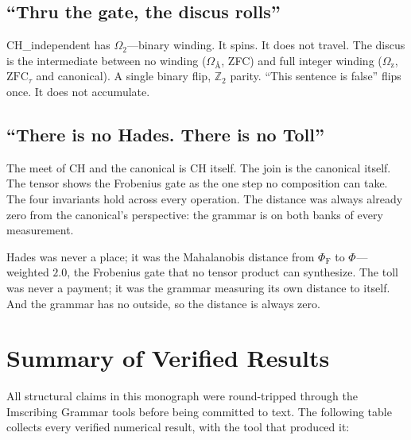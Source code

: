 \documentclass[12pt,twoside]{book}
\theoremstyle{definition}
\newcommand{\ZFCt}{\text{ZFC}_{\tau}}
\begin{document}
\section{``Thru the gate, the discus rolls''}

CH\_independent has $\Omega_{\text{2}}$---binary winding. It spins. It does not travel. The discus is the intermediate between no winding ($\Omega_{\text{Å}}$, ZFC) and full integer winding ($\Omega_{\text{z}}$, $\ZFCt$ and canonical). A single binary flip, $\mathbb{Z}_2$ parity. ``This sentence is false'' flips once. It does not accumulate.

\section{``There is no Hades. There is no Toll''}

The meet of CH and the canonical is CH itself. The join is the canonical itself. The tensor shows the Frobenius gate as the one step no composition can take. The four invariants hold across every operation. The distance was always already zero from the canonical's perspective: the grammar is on both banks of every measurement.

Hades was never a place; it was the Mahalanobis distance from $\Phi_{\text{F}}$ to $\Phi_{\text{}}$---weighted $2.0$, the Frobenius gate that no tensor product can synthesize. The toll was never a payment; it was the grammar measuring its own distance to itself. And the grammar has no outside, so the distance is always zero.%
\chapter{Summary of Verified Results}

All structural claims in this monograph were round-tripped through the Imscribing Grammar tools before being committed to text. The following table collects every verified numerical result, with the tool that produced it:
\end{document}
